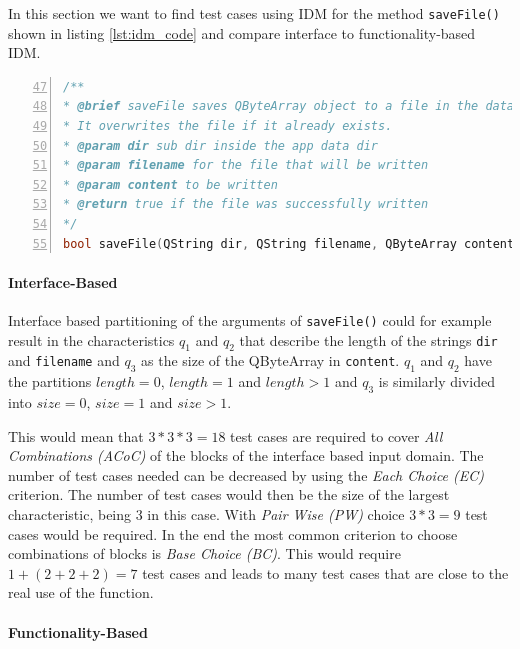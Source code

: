 \documentclass{scrreprt}
\begin{document}
In this section we want to find test cases using IDM for the method \texttt{saveFile()} shown in listing \ref{lst:idm_code} and compare interface to functionality-based IDM.

\bigskip
\begin{lstlisting}[language=C++,
							numbers=left,
							firstnumber=47,
							directivestyle={\color{black}}
							emph={int,char,double,float,unsigned},
							emphstyle={\color{blue}},
							caption=src/FileSystemManager.h,
							label=lst:idm_code]
/**
* @brief saveFile saves QByteArray object to a file in the data dir
* It overwrites the file if it already exists.
* @param dir sub dir inside the app data dir
* @param filename for the file that will be written
* @param content to be written
* @return true if the file was successfully written
*/
bool saveFile(QString dir, QString filename, QByteArray content) const;
\end{lstlisting}
\bigskip

\paragraph{Interface-Based}

Interface based partitioning of the arguments of \texttt{saveFile()} could for example result in the characteristics $q_1$ and $q_2$ that describe the length of the strings \texttt{dir} and \texttt{filename} and $q_3$ as the size of the QByteArray in \texttt{content}. $q_1$ and $q_2$ have the partitions $length=0$, $length=1$ and $length>1$ and $q_3$ is similarly divided into $size=0$, $size=1$ and $size>1$.

This would mean that $3*3*3=18$ test cases are required to cover \textit{All Combinations (ACoC)} of the blocks of the interface based input domain.
The number of test cases needed can be decreased by using the \textit{Each Choice (EC)} criterion. The number of test cases would then be the size of the largest characteristic, being 3 in this case. With \textit{Pair Wise (PW)} choice $3*3=9$ test cases would be required.
In the end the most common criterion to choose combinations of blocks is \textit{Base Choice (BC)}. This would require $1+(2+2+2)=7$ test cases and leads to many test cases that are close to the real use of the function.

\paragraph{Functionality-Based}
\end{document}
